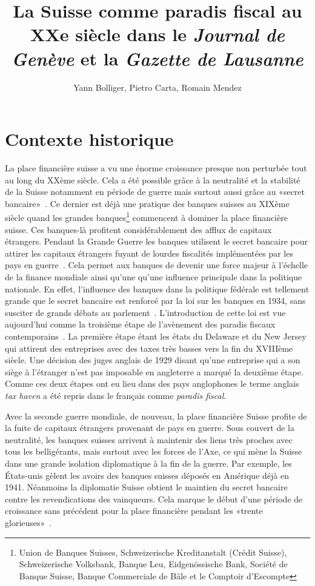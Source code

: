 \documentclass[11pt]{article}
\title{
  La Suisse comme paradis fiscal au XXe siècle dans le
  \textit{Journal de Genève} et la \textit{Gazette de Lausanne}
}
\author{Yann Bolliger, Pietro Carta, Romain Mendez}
\begin{document}
\maketitle

\section{Contexte historique}

La place financière suisse a vu une énorme croissance presque non perturbée tout
au long du XXème siècle. Cela a été possible grâce à la neutralité et la
stabilité de la Suisse notamment en période de guerre mais surtout aussi grâce
au «secret bancaire»~\citep[p. 512]{Mazbouri12}. Ce dernier est déjà une
pratique des banques suisses au XIXème siècle quand les grandes
banques\footnote{Union de Banques Suisses, Schweizerische Kreditanstalt (Crédit
Suisse), Schweizerische Volksbank, Banque Leu, Eidgenössische Bank, Société de
Banque Suisse, Banque Commerciale de Bâle et le Comptoir d’Escompte} commencent
à dominer la place financière suisse. Ces banques-là profitent considérablement
des afflux de capitaux étrangers. Pendant la Grande Guerre les banques
utilisent le secret bancaire pour attirer les capitaux étrangers fuyant de
lourdes fiscalités implémentées par les pays en guerre~\citep[p.
484-486]{Mazbouri12}.
Cela permet aux banques de devenir une force majeur à l’échelle de la finance mondiale
ainsi qu’une qu’une influence principale dans la politique nationale. En effet,
l’influence des banques dans la politique fédérale est tellement grande que le
secret bancaire est renforcé par la loi sur les banques en 1934, sans susciter
de grands débats au parlement~\citep{Guex99}. 
L'introduction de cette loi est vue aujourd'hui comme la troisième étape de 
l'avènement des paradis fiscaux contemporains~\citep[p. 29]{Chavagneux12}. La
première étape étant les états du Delaware et du New Jersey qui attirent des 
entreprises avec des taxes très basses vers la fin du XVIIIème siècle.
Une décision des juges anglais de 1929 disant qu'une entreprise qui a son siège à 
l'étranger n'est pas imposable en angleterre a marqué la deuxième étape. 
Comme ces deux étapes ont eu lieu dans des pays anglophones le terme anglais 
\textit{tax haven} a été repris dans le français comme \textit{paradis fiscal}.

Avec la seconde guerre mondiale, de nouveau, la place financière Suisse profite 
de la fuite de capitaux étrangers provenant de pays en guerre. Sous
couvert de la neutralité, les banques suisses arrivent à maintenir des liens
très proches avec tous les belligérants, mais surtout avec les forces de l’Axe,
ce qui mène la Suisse dans une grande isolation diplomatique à la fin de la
guerre. Par exemple, les États-unis gèlent les avoirs des banques suisses
déposés en Amérique déjà en 1941. Néanmoins la diplomatie Suisse obtient le
maintien du secret bancaire contre les revendications des vainqueurs. Cela
marque le début d’une période de croissance sans précédent pour la place
financière pendant les «trente glorieuses»~\citep[p. 495]{Mazbouri12}.
\end{document}
